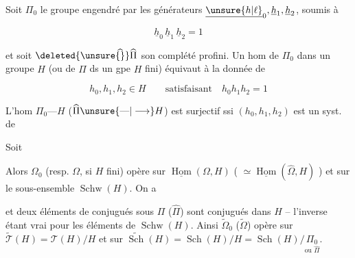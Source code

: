 Soit $\Pi_0$ le groupe engendré par les générateurs $\underline{\unsure{h|\ell}}_0,\underline h_1,\underline h_2$, soumis à

\[
 \underline h_0\,\underline h_1\,\underline h_2=1
\]

et soit $\deleted{\unsure{\widehat{\vphantom\Pi}}}\widehat\Pi$ son complété profini. Un hom de $\Pi_0$ dans un groupe $H$ (ou de $\widehat\Pi$ ds un gpe $H$ fini) équivaut à la donnée de

\[
 h_0,h_1,h_2\in H\qquad\text{satisfaisant}\quad h_0h_1h_2=1
\]


L'hom $\Pi_0\text{---}H$ ($\widehat\Pi\unsure{\text{---}|\longrightarrow}H$) est surjectif ssi $(h_0,h_1,h_2)$ est un syst. de 


Soit 


Alors $\Omega_0$ (resp. $\Omega$, si $H$ fini) opère  sur  $\underline{\operatorname{Hom}}(\Omega,H)$ ( $\simeq\underline{\operatorname{Hom}}(\widehat\Omega,H)$ ) et sur le sous-ensemble $\operatorname{Schw}(H)$. On a


et deux éléments de  conjugués sous $\Pi$ ($\widehat\Pi$) sont conjugués dans $H$ -- l'inverse étant vrai pour les éléments de $\operatorname{Schw}(H)$. Ainsi $\widetilde\Omega_0$ ($\widetilde\Omega$) opère sur $\widetilde{\mathcal T}(H)=\mathcal T(H)/H$ et sur $\widetilde{\operatorname{Sch}}(H)=\operatorname{Sch}(H)/H=\operatorname{Sch}(H)/\underset{\text{ou }\widehat\Pi}{\Pi_0}$.

